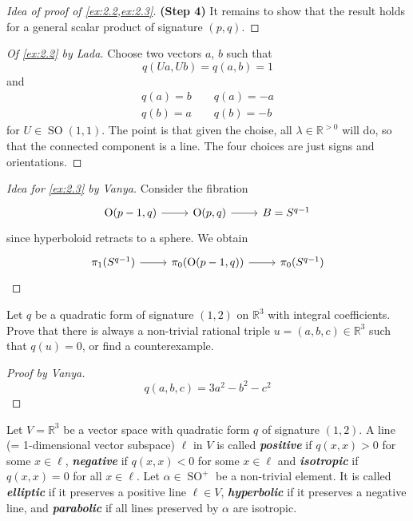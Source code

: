 \documentclass{article}
\numberwithin{equation}{section}
\newcommand{\R}{\mathbb{R}}
\renewcommand{\O}{\operatorname{O}}
\DeclareMathOperator{\SO}{SO}
\begin{document}
\begin{proof}[Idea of proof of \cref{ex:2.2,ex:2.3}]
		\textbf{(Step 4)} It remains to show that the result holds for a general scalar product of signature $(p,q)$.
		
	\end{proof}
	
	\begin{proof}[Of \cref{ex:2.2} by Lada]
		Choose two vectors $a$, $b$ such that
		\[q(Ua,Ub)=q(a,b)=1\]
		and
		\begin{align*}
			q(a)=b\qquad q(a)=-a\\
			q(b)=a\qquad q(b)=-b
		\end{align*}
		for $U\in\SO(1,1)$. The point is that given the choise, all $\lambda\in\R^{>0}$ will do, so that the connected component is a line. The four choices are just signs and orientations.
	\end{proof}
	
	\begin{proof}[Idea for \cref{ex:2.3} by Vanya]
		Consider the fibration
		\[\begin{tikzcd}
			\O(p-1,q)\arrow[r]&\O(p,q)\arrow[r]&B=S^{q-1}
		\end{tikzcd}\]
		since hyperboloid retracts to a sphere. We obtain
		\[\begin{tikzcd}
			\pi_1(S^{q-1})\arrow[r]&\pi_0(\O(p-1,q))\arrow[r]&\pi_0(S^{q-1})
		\end{tikzcd}\]
	\end{proof}
	
	\begin{exercise}
		Let $q$ be a quadratic form of signature $(1,2)$ on $\R^3$ with integral coefficients. Prove that there is always a non-trivial rational triple $u=(a,b,c)\in\R^3$ such that $q(u)=0$, or find a counterexample.
	\end{exercise}
	\begin{proof}[Proof by Vanya]
		\[q(a,b,c)=3a^2-b^2-c^2\]
	\end{proof}
	\begin{defn}
		Let $V=\R^3$ be a vector space with quadratic form $q$ of signature $(1,2)$. A line (= 1-dimensional vector subspace) $\ell$ in $V$ is called \textbf{\textit{positive}} if $q(x,x)>0$ for some $x\in\ell$, \textbf{\textit{negative}} if $q(x,x)<0$ for some $x\in\ell$ and \textbf{\textit{isotropic}} if $q(x,x)=0$ for all $x\in\ell$. Let $\alpha\in\SO^+$ be a non-trivial element. It is called \textbf{\textit{elliptic}} if it preserves a positive line $\ell\in V$, \textbf{\textit{hyperbolic}} if it preserves a negative line, and \textbf{\textit{parabolic}} if all lines preserved by $\alpha$ are isotropic.
	\end{defn}
	
\end{document}
